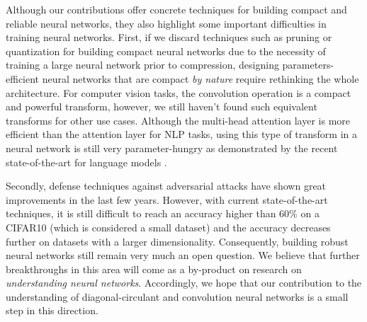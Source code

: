 Although our contributions offer concrete techniques for building compact and reliable neural networks, they also highlight some important difficulties in training neural networks. 
First, if we discard techniques such as pruning or quantization for building compact neural networks due to the necessity of training a large neural network prior to compression, designing parameters-efficient neural networks that are compact \emph{by nature} require rethinking the whole architecture.
For computer vision tasks, the convolution operation is a compact and powerful transform, however, we still haven't found such equivalent transforms for other use cases.
Although the multi-head attention layer is more efficient than the attention layer for NLP tasks, using this type of transform in a neural network is still very parameter-hungry as demonstrated by the recent state-of-the-art for language models \cite{brown2020language}.


Secondly, defense techniques against adversarial attacks have shown great improvements in the last few years.
However, with current state-of-the-art techniques, it is still difficult to reach an accuracy higher than 60\% on a CIFAR10 (which is considered a small dataset) and the accuracy decreases further on datasets with a larger dimensionality.
Consequently, building robust neural networks still remain very much an open question.
We believe that further breakthroughs in this area will come as a by-product on research on \emph{understanding neural networks}. 
Accordingly, we hope that our contribution to the understanding of diagonal-circulant and convolution neural networks is a small step in this direction.













